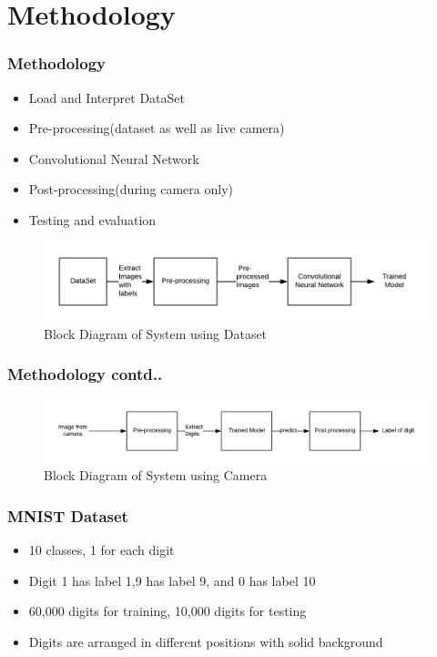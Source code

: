 \documentclass[11.5pt,aspectratio=1610,xcolor={usenames,dvipsnames,table}]{beamer}
\begin{document}
\section{Methodology}
\begin{frame}

\frametitle{Methodology}

\begin{itemize}
	\item Load and Interpret DataSet
	\item Pre-processing(dataset as well as live camera)
	\item Convolutional Neural Network
	\item Post-processing(during camera only)
	\item Testing and evaluation
\end{itemize}
\begin{figure}[!h]
	\includegraphics[width=\textwidth ]{images/methodology_1.png}
	\caption{Block Diagram of System using Dataset}
\end{figure}

\end{frame}

\begin{frame}

\frametitle{Methodology contd..}

\begin{figure}[!h]
	\includegraphics[width=\textwidth ]{images/methodology_2.png}
	\caption{Block Diagram of System using Camera}
\end{figure}


\end{frame}


\begin{frame}

\frametitle{MNIST Dataset \cite{mnist}  }

\begin{itemize}
	\item 10 classes, 1 for each digit
	\item Digit 1 has label 1,9 has label 9, and 0 has label 10
	\item 60,000 digits for training, 10,000 digits for testing
	\item Digits are arranged in different positions with solid background
\end{itemize}

\end{frame}
\end{document}
